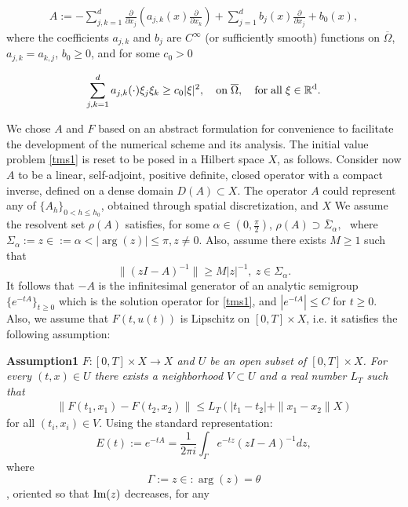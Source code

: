 \documentclass[12pt]{article}
\numberwithin{equation}{section} %
\begin{document}
\begin{eqnarray}
A := -\sum_{j,k=1}^d \frac{\partial}{\partial x_{j}} \left (
a_{j,k}(x)\frac{\partial}{\partial x_{k}} \right )+\sum_{j=1}^d
b_{j}(x)\frac{\partial}{\partial x_{j}}+b_{0}(x),
\end{eqnarray}
where the coefficients $a_{j,k}$ and $b_{j}$ are $C^{\infty}$ (or
sufficiently smooth) functions on $\overline{\Omega}$,
$a_{j,k}=a_{k,j}$, $b_{0} \ge 0$, and for some $c_0 > 0$

\begin{eqnarray}
\sum_{j,k=1}^d a_{j,k}(\cdot) \xi_{j} \xi_{k} \geq c_{0}
|\xi|^2,\quad \rm on \; \overline{\Omega}, \quad \rm{for\; all} \;
\xi \in  \mathbb{R}^{d}.
\end{eqnarray}


We chose $A$ and $F$ based on an abstract formulation for
convenience to facilitate the  development of the numerical scheme
and its analysis. The initial value problem \ref{tms1} is reset to
be posed in a Hilbert space ${X}$, as follows. Consider now $A$ to
be a linear, self-adjoint, positive definite, closed operator with a
compact inverse, defined on a dense domain $D(A) \subset {X}$.  The
operator $A$ could represent  any of $\{A_h\}_{0< h \le h_0}$,
obtained through spatial discretization, and  ${X}$ We assume the
resolvent set $\rho(A)$ satisfies, for some $\alpha \in
(0,\frac{\pi}{2} )$, $\rho(A) \supset \overline{\Sigma}_{\alpha},
\,\, $ where $\Sigma_{\alpha}:= { z \in := \alpha < |\arg(z)| \leq
\pi,z \neq 0}$. Also,  assume there exists $M \geq 1$ such that
\begin{equation}
\|(zI-A)^{-1}\| \geq M |z|^{-1}, \: z \in \Sigma_\alpha.
\end{equation}
It follows that $-A$ is the infinitesimal generator of an analytic
semigroup $\{e^{-tA}\}_{t\ge 0}$ which is the solution operator for
\ref{tms1}, and $|e^{-tA}| \leq C$ for ${t \ge 0}$. Also, we assume
that $F(t,u(t))$ is Lipschitz on $[0,T] \times X$, i.e. it satisfies
the following assumption:

\textbf{Assumption1}
 \label{assumption2}
  \emph{ $F:[0,T] \times X
\rightarrow X$ and $U$ be an open subset of $[0,T] \times X$. For
every $(t,x) \in U$ there exists a neighborhood $V \subset U$ and a
real number $L_{T}$ such that}
\begin{eqnarray}
\|F(t_1,x_1) - F(t_2,x_2)\| \leq L_{T} ( |t_1-t_2| + \|x_1-x_2\|X)
\label{lipschitz}
\end{eqnarray}
for all $(t_i, x_i) \in V $. Using the standard representation:
\begin{equation*}
E(t) := e^{-tA} = \frac{1}{2\pi i}
\int_{\Gamma}e^{-tz}(zI-A)^{-1}dz, \label{Eq3}
 \end{equation*}
 where
 \begin{equation*}
 \Gamma := {z \in :\arg(z) = \theta}
 \end{equation*}
 , oriented so that
$\mbox{\rm Im}(z)$ decreases, for any
\end{document}
